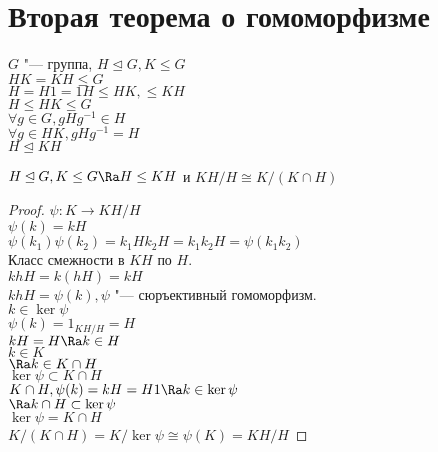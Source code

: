 ﻿\section{Вторая теорема о гомоморфизме}
$G$ "--- группа, $H \unlhd G, K \le G$\\
$HK = KH \le G$\\
$H = H1 = 1H \le HK, \le KH$\\

$H \le HK \le G$\\
$\forall g \in G, gHg^{-1} \in H$\\
$\forall g \in HK, gHg^{-1} = H$\\
$H \unlhd KH$\\
\begin{theorem}
$H \unlhd G, K \le G \Ra H \le KH$ и $KH/H \cong K/(K \cap H)$\\
\end{theorem}
\begin{proof}
$\psi \colon K \to KH/H$\\
$\psi(k) = kH$\\
$\psi(k_1)\psi(k_2) = k_1Hk_2H = k_1k_2H = \psi(k_1k_2)$\\

Класс смежности в $KH$ по $H$.\\
$khH = k(hH) = kH$\\
$khH = \psi(k), \psi$ "--- сюръективный гомоморфизм.\\

$k \in \ker \psi$\\
$\psi(k) = 1_{KH/H} = H$\\
$kH = H \Ra k \in H$\\
$k \in K$\\
$\Ra k \in  K \cap H$\\

$\ker \psi \subset K \cap H$\\
$K \cap H, \psi(k) = kH = H1 \Ra k \in \ker \psi$\\
$\Ra k \cap H \subset \ker \psi$\\
$\ker \psi = K \cap H$\\

$K/(K \cap H) = K/\ker \psi \cong \psi(K) = KH/H$
\end{proof}
